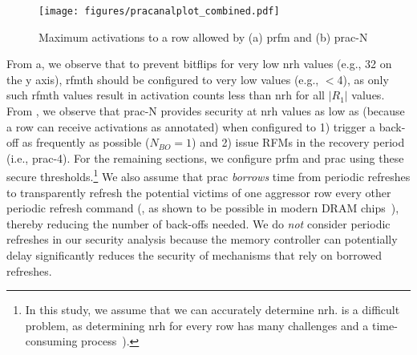 \begin{figure}[h]
\centering
\texttt{[image: figures/pracanalplot\_combined.pdf]}
\caption{Maximum activations to a row allowed by (a) \gls{prfm} and (b) \gls{prac}-N}
\label{fig:rfmpracanalysis}
\end{figure}

From a, we observe that to prevent bitflips for very low \gls{nrh} values (e.g., 32 on the y axis), \gls{rfmth} should be configured to very low values (e.g., $<$4), as only such \gls{rfmth} values result in activation counts less than \gls{nrh} for all $|R_1|$ values.
From , we observe that \gls{prac}-N provides security at \gls{nrh} values as low as  (because a row can receive  activations as annotated) when configured to 1) trigger a back-off as frequently as possible ($N_{BO}=1$) and 2) issue  RFMs
in the recovery period (i.e., \gls{prac}-4).
For the remaining sections, we configure \gls{prfm} and \gls{prac} using these secure thresholds.\footnote{In this study, we assume that we can accurately determine \gls{nrh}.  is a difficult problem, as determining \gls{nrh} for every row has many challenges and a time-consuming process~\cite{kim2014flipping, orosa2021deeper, luo2023rowpress, kim2020revisiting, saroiu2022configure, olgun2023understanding, olgun2024read, zhou2023threshold, olgun2025variable}).}
We also assume that \gls{prac} \emph{borrows} time from periodic refreshes to transparently refresh the potential victims of one aggressor row every other periodic refresh command (, as shown to be possible in modern DRAM chips~\cite{hassan2021utrr}), thereby reducing the number of back-offs needed.
We do \emph{not} consider periodic refreshes in our security analysis because the memory controller can potentially delay  significantly reduces the security of mechanisms that rely on borrowed refreshes.